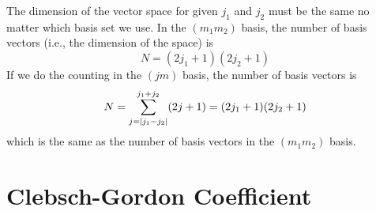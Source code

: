 The dimension of the vector space for given $j_1$ and $j_2$ must be the same no matter which basis set we use. In the $(m_1 m_2)$ basis, the number of basis vectors (i.e., the dimension of the space) is
\begin{equation}
N = (2 j_1 + 1)(2 j_2 + 1)
\end{equation}
If we do the counting in the $(j m)$ basis, the number of basis vectors is
\begin{equation}
N = \sum_{j = \abs{j_1 - j_2}}^{j_1 + j_2} (2 j + 1) = (2 j_1 + 1)(2 j_2 + 1)
\end{equation}
which is the same as the number of basis vectors in the $(m_1 m_2)$ basis.



\section{Clebsch-Gordon Coefficient}

